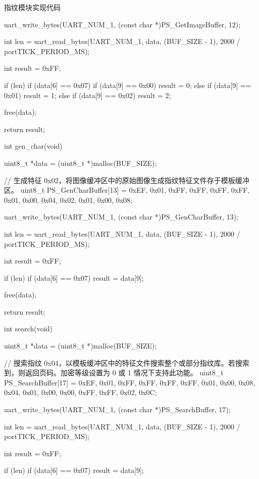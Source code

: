 \documentclass[lang=cn,newtx,10pt,scheme=chinese]{elegantbook}
\begin{document}
\begin{mycode}{指纹模块实现代码}
{    uart_write_bytes(UART_NUM_1, (const char *)PS_GetImageBuffer, 12);

    int len = uart_read_bytes(UART_NUM_1, data, (BUF_SIZE - 1), 2000 / portTICK_PERIOD_MS);

    int result = 0xFF;

    if (len)
    {
        if (data[6] == 0x07)
        {
            if (data[9] == 0x00)
            {
                result = 0;
            }
            else if (data[9] == 0x01)
            {
                result = 1;
            }
            else if (data[9] == 0x02)
            {
                result = 2;
            }
        }
    }

    free(data);

    return result;
}

int gen_char(void)
{
    uint8_t *data = (uint8_t *)malloc(BUF_SIZE);

    // 生成特征 0x02，将图像缓冲区中的原始图像生成指纹特征文件存于模板缓冲区。
    uint8_t PS_GenCharBuffer[13] = {0xEF, 0x01, 0xFF, 0xFF, 0xFF, 0xFF, 0x01, 0x00, 0x04, 0x02, 0x01, 0x00, 0x08};

    uart_write_bytes(UART_NUM_1, (const char *)PS_GenCharBuffer, 13);

    int len = uart_read_bytes(UART_NUM_1, data, (BUF_SIZE - 1), 2000 / portTICK_PERIOD_MS);

    int result = 0xFF;

    if (len)
    {
        if (data[6] == 0x07)
        {
            result = data[9];
        }
    }

    free(data);

    return result;
}

int search(void)
{
    uint8_t *data = (uint8_t *)malloc(BUF_SIZE);

    // 搜索指纹 0x04，以模板缓冲区中的特征文件搜索整个或部分指纹库。若搜索到，则返回页码。加密等级设置为 0 或 1 情况下支持此功能。
    uint8_t PS_SearchBuffer[17] = {0xEF, 0x01, 0xFF, 0xFF, 0xFF, 0xFF, 0x01, 0x00, 0x08, 0x04, 0x01, 0x00, 0x00, 0xFF, 0xFF, 0x02, 0x0C};

    uart_write_bytes(UART_NUM_1, (const char *)PS_SearchBuffer, 17);

    int len = uart_read_bytes(UART_NUM_1, data, (BUF_SIZE - 1), 2000 / portTICK_PERIOD_MS);

    int result = 0xFF;

    if (len)
    {
        if (data[6] == 0x07)
        {
            result = data[9];
        }
    }

}
\end{mycode}
\end{document}
